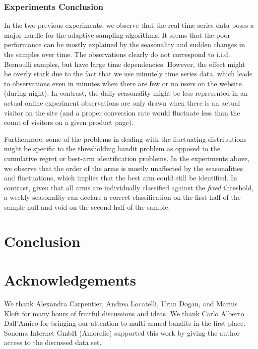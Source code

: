 \documentclass[11pt,]{article}
\begin{document}
\subsubsection{Experiments Conclusion}\label{experiments-conclusion}

In the two previous experiments, we observe that the real time series
data poses a major hurdle for the adaptive sampling algorithms. It seems
that the poor performance can be mostly explained by the seasonality and
sudden changes in the samples over time. The observations clearly do not
correspond to i.i.d. Bernoulli samples, but have large time
dependencies. However, the effect might be overly stark due to the fact
that we use minutely time series data, which leads to observations even
in minutes when there are few or no users on the website (during night).
In contrast, the daily seasonality might be less represented in an
actual online experiment observations are only drawn when there is an
actual visitor on the site (and a proper conversion rate would fluctuate
less than the count of visitors on a given product page).

Furthermore, some of the problems in dealing with the fluctuating
distributions might be specific to the thresholding bandit problem as
opposed to the cumulative regret or best-arm identification problems. In
the experiments above, we observe that the order of the arms is mostly
unaffected by the seasonalities and fluctuations, which implies that the
best arm could still be identified. In contrast, given that all arms are
individually classified against the \emph{fixed} threshold, a weekly
seasonality can declare a correct classification on the first half of
the sample null and void on the second half of the sample.

\section{Conclusion}\label{conclusion}

\section{Acknowledgements}\label{acknowledgements}

We thank Alexandra Carpentier, Andrea Locatelli, Urun Dogan, and Marius
Kloft for many hours of fruitful discussions and ideas. We thank Carlo
Alberto Dall'Amico for bringing our attention to multi-armed bandits in
the first place. Sonoma Internet GmbH (Amorelie) supported this work by
giving the author access to the discussed data set.
\end{document}
